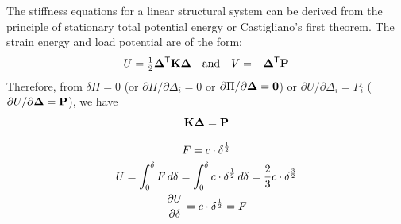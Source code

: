 The stiffness equations for a linear structural system can be derived from the principle of stationary total potential energy or Castigliano's first theorem. The strain energy and load potential are of the form:
\begin{equation}
  U = \tfrac12\bm{\Delta}^{\mathsf{T}}\mathbf{K}\bm{\Delta}\quad\text{and}\quad V = -\bm{\Delta}^{\mathsf{T}}\mathbf{P}
\end{equation}
Therefore, from $\delta\Pi = 0$ (or $\partial\Pi/\partial\Delta_i = 0$ or $\partial\Pi/\partial\bm{\Delta} = \mathbf{0}$) or $\partial U/\partial\Delta_i = P_i$ ($\partial U/\partial\bm{\Delta} = \mathbf{P}$), we have
\begin{equation}
  \mathbf{K}\bm{\Delta} = \mathbf{P}
\end{equation}

\begin{fig}
  
\end{fig}
\begin{gather*}
  F = c\cdot\delta^{\frac12}\\
  U = \int_0^\delta F\,d\delta = \int_0^\delta c\cdot\delta^{\frac12}\,d\delta = \frac23 c\cdot\delta^{\frac32}\\
  \frac{\partial U}{\partial \delta} = c\cdot\delta^{\frac12} = F
\end{gather*}

